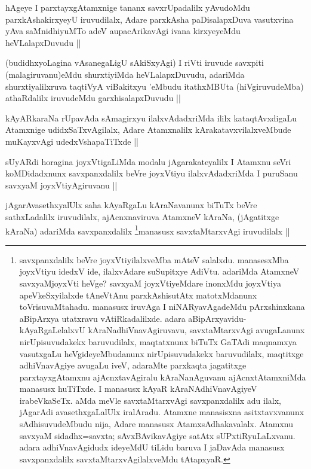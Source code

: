 \begin{artha}
hAgeye I parxtayxgAtamxnige tananx savxrUpadalilx yAvudoMdu parxkAshakirxyeyU iruvudilalx, Adare parxkAsha paDisalapxDuva vasutxvina yAva saMnidhiyuMTo adeV aupacArikavAgi ivana kirxyeyeMdu heVLalapxDuvudu ||
\end{artha}


\begin{artha}
(budidhxyoLagina vAsanegaLigU sAkiSxyAgi) I riVti iruvude savxpiti (malagiruvanu)eMdu shurxtiyiMda heVLalapxDuvudu, adariMda shurxtiyalilxruva taqtiVyA viBakitxyu \stext'eMbudu itathxMBUta (hiVgiruvudeMba) athaRdalilx iruvudeMdu garxhisalapxDuvudu ||
\end{artha}


\begin{artha}
kAyARkaraNa rUpavAda sAmagirxyu ilalxvAdadxriMda ililx kataqtAvxdigaLu Atamxnige udidxSaTxvAgilalx, Adare Atamxnalilx kArakatavxvilalxveMbude muKayxvAgi udedxVshapaTiTxde ||
\end{artha}


\begin{artha}
sUyARdi horagina joyxVtigaLiMda modalu jAgarakateyalilx I Atamxnu seVri koMDidadxnunx savxpanxdalilx beVre joyxVtiyu ilalxvAdadxriMda I puruSanu savxyaM joyxVtiyAgiruvanu || 
\end{artha}


\begin{artha}
jAgarAvasethxyalUlx saha kAyaRgaLu kAraNavanunx biTuTx beVre sathxLadalilx iruvudilalx, ajAcnxnaviruva AtamxneV kAraNa, (jAgatitxge kAraNa) adariMda savxpanxdalilx \footnote[1]{savxpanxdalilx beVre joyxVtiyilalxveMba mAteV salalxdu. manasesxMba joyxVtiyu idedxV ide, ilalxvAdare suSupitxye AdiVtu. adariMda AtamxneV savxyaMjoyxVti heVge? savxyaM joyxVtiyeMdare inonxMdu joyxVtiya apeVkeSxyilalxde tAneVtAnu parxkAshisutAtx matotxMdanunx toVrisuvaMtahadu. manasusx iruvAga I niNARyavAgadeMdu pArxshinxkana aBipArxya utatxravu vAtiRkadalilxde. adara aBipArxyavidu-kAyaRgaLelalxvU kAraNadhiVnavAgiruvavu, savxtaMtarxvAgi avugaLanunx nirUpisuvudakekx baruvudilalx, maqtatxnunx biTuTx GaTAdi maqnamxya vasutxgaLu  heVgideyeMbudanunx nirUpisuvudakekx baruvudilalx, maqtitxge adhiVnavAgiye avugaLu iveV, adaraMte parxkaqta jagatitxge parxtayxgAtamxnu ajAcnxtavAgiralu kAraNanAguvanu ajAcnxtAtamxniMda manasusx huTiTxde. I manasusx kAyaR kAraNAdhiVnavAgiyeV irabeVkaSeTx. aMda meVle savxtaMtarxvAgi savxpanxdalilx adu ilalx, jAgarAdi avasethxgaLalUlx iralAradu. Atamxne manasisxna asitxtavxvanunx sAdhisuvudeMbudu nija, Adare manasusx AtamxsAdhakavalalx. Atamxnu savxyaM sidadhx=savxta; sAvxBAvikavAgiye satAtx sUPxtiRyuLaLxvanu. adara adhiVnavAgidudx ideyeMdU tiLidu baruva I jaDavAda manasusx savxpanxdalilx savxtaMtarxvAgilalxveMdu tAtapxyaR.}manasusx savxtaMtarxvAgi iruvudilalx ||
\end{artha}

